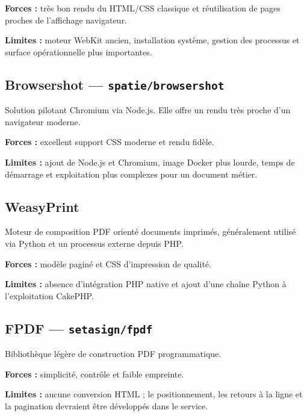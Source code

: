 \documentclass[11pt,a4paper]{article}
\begin{document}
\textbf{Forces :} très bon rendu du HTML/CSS classique et réutilisation de
pages proches de l'affichage navigateur.

\textbf{Limites :} moteur WebKit ancien, installation système, gestion des
processus et surface opérationnelle plus importantes.

\subsection{Browsershot — \texttt{spatie/browsershot}}

Solution pilotant Chromium via Node.js. Elle offre un rendu très proche d'un
navigateur moderne.

\textbf{Forces :} excellent support CSS moderne et rendu fidèle.

\textbf{Limites :} ajout de Node.js et Chromium, image Docker plus lourde,
temps de démarrage et exploitation plus complexes pour un document métier.

\subsection{WeasyPrint}

Moteur de composition PDF orienté documents imprimés, généralement utilisé via
Python et un processus externe depuis PHP.

\textbf{Forces :} modèle paginé et CSS d'impression de qualité.

\textbf{Limites :} absence d'intégration PHP native et ajout d'une chaîne
Python à l'exploitation CakePHP.

\subsection{FPDF — \texttt{setasign/fpdf}}

Bibliothèque légère de construction PDF programmatique.

\textbf{Forces :} simplicité, contrôle et faible empreinte.

\textbf{Limites :} aucune conversion HTML ; le positionnement, les retours à la
ligne et la pagination devraient être développés dans le service.
\end{document}
